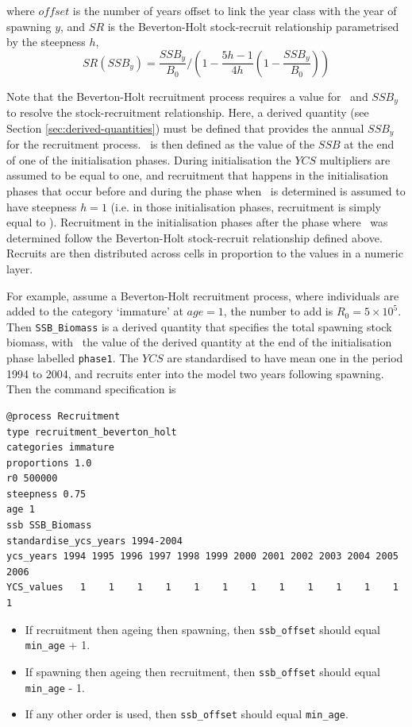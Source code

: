 where $offset$ is the number of years offset to link the year class with the year of spawning $y$, and $SR$ is the Beverton-Holt stock-recruit relationship parametrised by the steepness $h$,
\begin{equation}
SR(SSB_y) = \frac{SSB_y}{B_0} / \left( 1-\frac{5h-1}{4h} \left( 1-\frac{SSB_y}{B_0} \right) \right)
\end{equation}

Note that the Beverton-Holt recruitment process requires a value for \Bzero\ and $SSB_y$ to resolve the stock-recruitment relationship. Here, a derived quantity (see Section \ref{sec:derived-quantities}) must be defined that provides the annual $SSB_y$ for the recruitment process. \Bzero\ is then defined as the value of the $SSB$ at the end of one of the initialisation phases. During initialisation the $YCS$ multipliers are assumed to be equal to one, and recruitment that happens in the initialisation phases that occur before and during the phase when \Bzero\ is determined is assumed to have steepness $h=1$ (i.e. in those initialisation phases, recruitment is simply equal to \Rzero). Recruitment in the initialisation phases after the phase where \Bzero\ was determined follow the Beverton-Holt stock-recruit relationship defined above. Recruits are then distributed across cells in proportion to the values in a numeric layer. 

For example, assume a Beverton-Holt recruitment process, where individuals are added to the category `immature' at $age=1$, the number to add is $R_0=5 \times 10^5$. Then \texttt{SSB\_Biomass} is a derived quantity that specifies the total spawning stock biomass, with \Bzero\ the value of the derived quantity at the end of the initialisation phase labelled \texttt{phase1}. The $YCS$ are standardised to have mean one in the period 1994 to 2004, and recruits enter into the model two years following spawning. Then the command specification is

{\small{\begin{verbatim}
@process Recruitment
type recruitment_beverton_holt
categories immature
proportions 1.0
r0 500000
steepness 0.75
age 1
ssb SSB_Biomass
standardise_ycs_years 1994-2004
ycs_years 1994 1995 1996 1997 1998 1999 2000 2001 2002 2003 2004 2005 2006
YCS_values   1    1    1    1    1    1    1    1    1    1    1    1    1
\end{verbatim}}}

\begin{itemize}
	\item If recruitment then ageing then spawning, then \texttt{ssb\_offset} should equal \texttt{min\_age} + 1.
	\item If spawning then ageing then recruitment, then \texttt{ssb\_offset} should equal \texttt{min\_age} - 1.
	\item If any other order is used, then \texttt{ssb\_offset} should equal \texttt{min\_age}.
\end{itemize}


